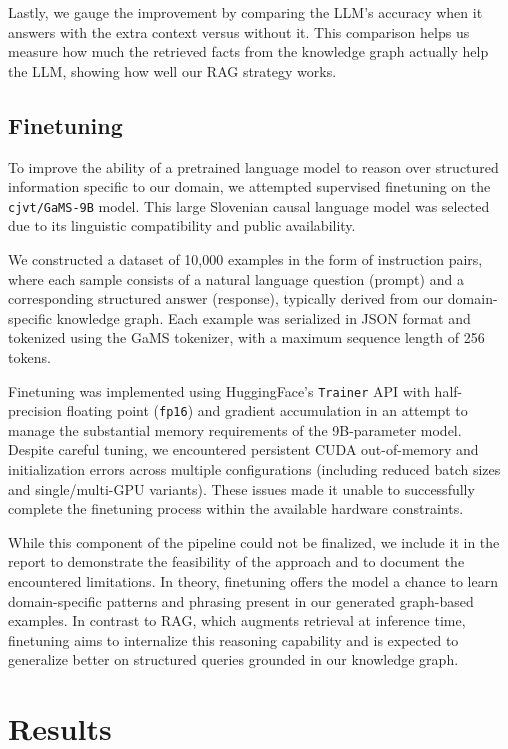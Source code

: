 \documentclass[fleqn,moreauthors,10pt]{ds_report}
\begin{document}
Lastly, we gauge the improvement by comparing the LLM's accuracy when it answers with the extra context versus without it. This comparison helps us measure how much the retrieved facts from the knowledge graph actually help the LLM, showing how well our RAG strategy works.

\subsection*{Finetuning}

To improve the ability of a pretrained language model to reason over structured information specific to our domain, we attempted supervised finetuning on the \texttt{cjvt/GaMS-9B} model. This large Slovenian causal language model was selected due to its linguistic compatibility and public availability.

We constructed a dataset of 10{,}000 examples in the form of instruction pairs, where each sample consists of a natural language question (prompt) and a corresponding structured answer (response), typically derived from our domain-specific knowledge graph. Each example was serialized in JSON format and tokenized using the GaMS tokenizer, with a maximum sequence length of 256 tokens.

Finetuning was implemented using HuggingFace’s \texttt{Trainer} API with half-precision floating point (\texttt{fp16}) and gradient accumulation in an attempt to manage the substantial memory requirements of the 9B-parameter model. Despite careful tuning, we encountered persistent CUDA out-of-memory and initialization errors across multiple configurations (including reduced batch sizes and single/multi-GPU variants). These issues made it unable to successfully complete the finetuning process within the available hardware constraints.

While this component of the pipeline could not be finalized, we include it in the report to demonstrate the feasibility of the approach and to document the encountered limitations. In theory, finetuning offers the model a chance to learn domain-specific patterns and phrasing present in our generated graph-based examples. In contrast to RAG, which augments retrieval at inference time, finetuning aims to internalize this reasoning capability and is expected to generalize better on structured queries grounded in our knowledge graph.

\section*{Results}
\end{document}
